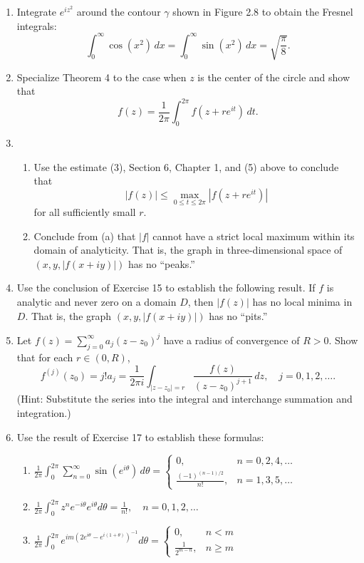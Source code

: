\documentclass[12pt]{article}
\theoremstyle{definition} %
\theoremstyle{plain} %
\begin{document}
\begin{enumerate}
    \item Integrate $e^{iz^2}$ around the contour $\gamma$ shown in Figure 2.8 to obtain the Fresnel integrals:
    \[
    \int_0^\infty \cos(x^2) \, dx = \int_0^\infty \sin(x^2) \, dx = \sqrt{\frac{\pi}{8}}.
    \]
    
    \item Specialize Theorem 4 to the case when $z$ is the center of the circle and show that
    \[
    f(z) = \frac{1}{2\pi} \int_0^{2\pi} f(z + re^{it}) \, dt.
    \]
    
    \item 
    \begin{enumerate}
        \item Use the estimate (3), Section 6, Chapter 1, and (5) above to conclude that
        \[
        |f(z)| \le \max_{0 \le t \le 2\pi} |f(z + re^{it})|
        \]
        for all sufficiently small $r$.
        
        \item Conclude from (a) that $|f|$ cannot have a strict local maximum within its domain of analyticity. That is, the graph in three-dimensional space of $(x, y, |f(x + iy)|)$ has no “peaks.”
    \end{enumerate}
    
    \item Use the conclusion of Exercise 15 to establish the following result. If $f$ is analytic and never zero on a domain $D$, then $|f(z)|$ has no local minima in $D$. That is, the graph $(x, y, |f(x + iy)|)$ has no “pits.”
    
    \item Let $f(z) = \sum_{j=0}^\infty a_j(z - z_0)^j$ have a radius of convergence of $R > 0$. Show that for each $r \in (0, R)$,
    \[
    f^{(j)}(z_0) = j! a_j = \frac{1}{2\pi i} \int_{|z - z_0| = r} \frac{f(z)}{(z - z_0)^{j+1}} \, dz, \quad j = 0, 1, 2, \ldots.
    \]
    (Hint: Substitute the series into the integral and interchange summation and integration.)
    
    \item Use the result of Exercise 17 to establish these formulas:
    \begin{enumerate}
        \item $\frac{1}{2\pi} \int_0^{2\pi} \sum_{n=0}^\infty \sin(e^{i\theta}) \, d\theta = 
            \begin{cases}
            0, & n = 0, 2, 4, \ldots \\
            \frac{(-1)^{(n - 1)/2}}{n!}, & n = 1, 3, 5, \ldots
            \end{cases}$
        \item $\frac{1}{2\pi} \int_0^{2\pi} z^n e^{-i\theta} e^{i\theta} d\theta = \frac{1}{n!}, \quad n = 0, 1, 2, \ldots$
        \item $\frac{1}{2\pi} \int_0^{2\pi} e^{im(2e^{i\theta} - e^{i(1+\theta)})^{-1}} d\theta = 
            \begin{cases}
            0, & n < m \\
            \frac{1}{2^{m - n}}, & n \ge m
            \end{cases}$
    \end{enumerate}
    

\end{enumerate}
\end{document}
